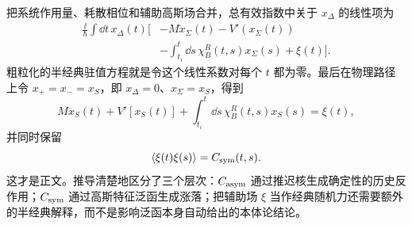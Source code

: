 \begin{derivation}[影响泛函中的随机力与因果反作用]
把系统作用量、耗散相位和辅助高斯场合并，总有效指数中关于 $x_\Delta$ 的线性项为
\begin{align*}
 \frac{\ii}{\hbar}\int\dd t\,x_\Delta(t)
 \Bigg[&-M\ddot x_\Sigma(t)-V'(x_\Sigma(t))\\
 &-\int_{t_i}^{t}\dd s\,\chi_B^R(t,s)x_\Sigma(s)
 +\xi(t)\Bigg].
\end{align*}
粗粒化的半经典驻值方程就是令这个线性系数对每个 $t$ 都为零。最后在物理路径上令 $x_+=x_-=x_S$，即 $x_\Delta=0$、$x_\Sigma=x_S$，得到
\begin{equation*}
 M\ddot x_S(t)+V'[x_S(t)]
 +\int_{t_i}^{t}\dd s\,\chi_B^R(t,s)x_S(s)
 =\xi(t),
\end{equation*}
并同时保留
\begin{equation*}
 \langle\xi(t)\xi(s)\rangle=C_{\rm sym}(t,s).
\end{equation*}
这才是正文。推导清楚地区分了三个层次：$C_{\rm asym}$ 通过推迟核生成确定性的历史反作用；$C_{\rm sym}$ 通过高斯特征泛函生成涨落；把辅助场 $\xi$ 当作经典随机力还需要额外的半经典解释，而不是影响泛函本身自动给出的本体论结论。
\end{derivation}

